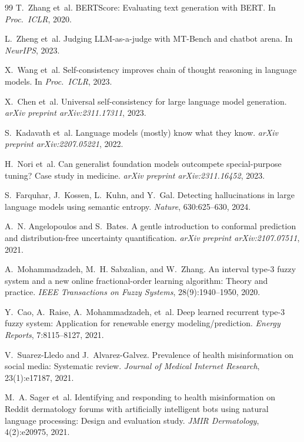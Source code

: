 \documentclass[10pt,letterpaper]{article}
\begin{document}
\begin{thebibliography}{99}
T.~Zhang et~al.
\newblock BERTScore: Evaluating text generation with BERT.
\newblock In \emph{Proc.\ ICLR}, 2020.

L.~Zheng et~al.
\newblock Judging LLM-as-a-judge with MT-Bench and chatbot arena.
\newblock In \emph{NeurIPS}, 2023.

X.~Wang et~al.
\newblock Self-consistency improves chain of thought reasoning in language
models.
\newblock In \emph{Proc.\ ICLR}, 2023.

X.~Chen et~al.
\newblock Universal self-consistency for large language model generation.
\newblock \emph{arXiv preprint arXiv:2311.17311}, 2023.

S.~Kadavath et~al.
\newblock Language models (mostly) know what they know.
\newblock \emph{arXiv preprint arXiv:2207.05221}, 2022.

H.~Nori et~al.
\newblock Can generalist foundation models outcompete special-purpose tuning?
Case study in medicine.
\newblock \emph{arXiv preprint arXiv:2311.16452}, 2023.

S.~Farquhar, J.~Kossen, L.~Kuhn, and Y.~Gal.
\newblock Detecting hallucinations in large language models using semantic
entropy.
\newblock \emph{Nature}, 630:625--630, 2024.

A.~N. Angelopoulos and S.~Bates.
\newblock A gentle introduction to conformal prediction and distribution-free
uncertainty quantification.
\newblock \emph{arXiv preprint arXiv:2107.07511}, 2021.

A.~Mohammadzadeh, M.~H. Sabzalian, and W.~Zhang.
\newblock An interval type-3 fuzzy system and a new online fractional-order
learning algorithm: Theory and practice.
\newblock \emph{IEEE Transactions on Fuzzy Systems}, 28(9):1940--1950, 2020.

Y.~Cao, A.~Raise, A.~Mohammadzadeh, et~al.
\newblock Deep learned recurrent type-3 fuzzy system: Application for renewable
energy modeling/prediction.
\newblock \emph{Energy Reports}, 7:8115--8127, 2021.

V.~Suarez-Lledo and J.~Alvarez-Galvez.
\newblock Prevalence of health misinformation on social media: Systematic
review.
\newblock \emph{Journal of Medical Internet Research}, 23(1):e17187, 2021.

M.~A. Sager et~al.
\newblock Identifying and responding to health misinformation on Reddit
dermatology forums with artificially intelligent bots using natural language
processing: Design and evaluation study.
\newblock \emph{JMIR Dermatology}, 4(2):e20975, 2021.

\end{thebibliography}
\end{document}
